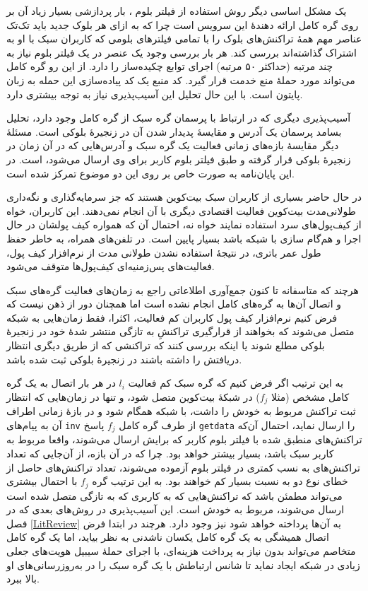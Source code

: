 یک مشکل اساسی دیگر روش استفاده از فیلتر بلوم \cite{Hearn2013}، بار پردازشی بسیار زیاد آن بر روی گره کامل ارائه دهندهٔ این سرویس است چرا که به ازای هر بلوک جدید باید تک‌تک عناصر مهم همهٔ تراکنش‌های بلوک را با تمامی فیلتر‌های بلومی که کاربران سبک با او به اشتراک گذاشته‌اند بررسی کند. هر بار بررسی وجود یک عنصر در یک فیلتر بلوم نیاز به چند مرتبه (حداکثر ۵۰ مرتبه) اجرای توابع چکیده‌ساز را دارد. از این رو گره کامل می‌تواند مورد 
حملهٔ منع خدمت 
قرار گیرد. کد منبع \cite{PeterTodd} یک کد پیاده‌سازی این حمله به زبان پایتون است. با این حال تحلیل این آسیب‌پذیری نیاز به توجه بیشتری دارد.

آسیب‌پذیری دیگری که در ارتباط با پرسمان‌ گره سبک از گره کامل وجود دارد، تحلیل بسامد پرسمان یک آدرس  و مقایسهٔ پدیدار شدن آن در زنجیرهٔ بلوکی است. مسئلهٔ دیگر مقایسهٔ بازه‌های زمانی فعالیت یک گره سبک و آدرس‌هایی که در آن زمان در زنجیرهٔ بلوکی قرار گرفته و طبق فیلتر بلوم کاربر برای وی ارسال می‌شود، است. در این پایان‌نامه به صورت خاص بر روی این دو موضوع تمرکز شده است. 

در حال حاضر بسیاری از کاربران سبک بیت‌کوین هستند که جز سرمایه‌گذاری و نگه‌داری طولانی‌مدت بیت‌کوین فعالیت اقتصادی دیگری با آن انجام نمی‌دهند. این کاربران، خواه از کیف‌پول‌های سرد استفاده نمایند خواه نه، احتمال آن که همواره کیف پولشان در حال اجرا و هم‌گام سازی با شبکه باشد بسیار پایین است. در تلفن‌های همراه، به خاطر حفظ طول عمر باتری، در نتیجهٔ استفاده نشدن طولانی مدت از نرم‌افزار کیف پول، فعالیت‌‌های پس‌زمنیه‌‌ای کیف‌پول‌ها متوقف می‌شود.  

هرچند که متاسفانه تا کنون جمع‌آوری اطلاعاتی راجع به زمان‌های فعالیت گره‌های سبک و اتصال آن‌ها به گره‌های کامل انجام نشده است اما همچنان دور از ذهن نیست که فرض کنیم نرم‌افزار کیف پول کاربران کم فعالیت، اکثرا، فقط زمان‌هایی به شبکه متصل می‌شوند که بخواهند از قرارگیری تراکنشِ به تازگی منتشر شدهٔ خود در زنجیرهٔ بلوکی مطلع شوند یا اینکه بررسی کنند که تراکنشی که از طریق دیگری انتظار دریافتش را داشته باشند در زنجیرهٔ بلوکی ثبت شده باشد. 

به این ترتیب اگر فرض کنیم که گره سبک کم فعالیت $l_i$ در هر بار اتصال به یک گره کامل مشخص (مثلا $f_j$) در شبکهٔ بیت‌کوین  متصل شود، و تنها در زمان‌هایی که انتظار ثبت تراکنش مربوط به خودش را داشت، با شبکه همگام شود و در بازهٔ زمانی اطراف آن به پیام‌های \texttt{inv} از طرف گره کامل $f_j$ پاسخ‌ \texttt{getdata} را ارسال نماید، احتمال آن‌که تراکنش‌های منطبق شده با فیلتر بلوم کاربر که برایش ارسال می‌شوند، واقعا مربوط به کاربر سبک باشد، بسیار بیشتر خواهد بود. چرا که در آن بازه، از آن‌جایی که  تعداد تراکنش‌های به نسب کمتری در فیلتر بلوم آزموده می‌شوند،‌ تعداد تراکنش‌های حاصل از خطای نوع دو به نسبت بسیار کم خواهند بود. به این ترتیب گره $f_j$ با احتمال بیشتری می‌تواند مطمئن باشد که تراکنش‌هایی که به کاربری که به تازگی متصل شده است ارسال می‌شوند، مربوط به خودش است.  این آسیب‌پذیری در روش‌های بعدی که در فصل \ref{LitReview} به آن‌ها پرداخته خواهد شود نیز وجود دارد. هرچند در ابتدا فرض اتصال همیشگی به یک گره کامل یکسان ناشدنی به نظر بیاید، اما یک گره کامل متخاصم می‌تواند بدون نیاز به پرداخت هزینه‌ای، با اجرای 
حملهٔ سیبیل
هویت‌های جعلی زیادی در شبکه ایجاد نماید تا شانس ارتباطش با یک گره سبک را در به‌روزرسانی‌های او بالا ببرد. 


